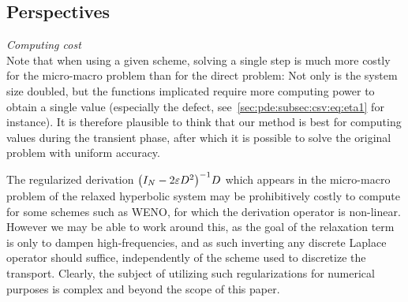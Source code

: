 \subsection{Perspectives} 
\label{sec:tests:subsec:thoughts}

\hspace*{1em}

\noindent\textit{Computing cost}\\
%
Note that when using a given scheme, solving a single step is much more
costly for the micro-macro problem than for the direct problem: Not only
is the system size doubled, but the functions implicated require more
computing power to obtain a single value (especially the defect,
see~\eqref{sec:pde:subsec:csv:eq:eta1} for instance). It is therefore 
plausible to think that our method is best for computing values during the
transient phase, after which it is possible to solve the original problem 
with uniform accuracy. 

The regularized derivation $\big( I_N - 2\varepsilon D^2 \big)^{-1} D$ which
appears in the micro-macro problem of the relaxed hyperbolic system may be
prohibitively costly to compute for some schemes such as WENO, for which
the derivation operator is non-linear. However we may be able to work
around this, as the goal of the relaxation term is only to dampen
high-frequencies, and as such inverting any discrete Laplace operator
should suffice, independently of the scheme used to discretize the
transport. Clearly, the subject of utilizing such regularizations for
numerical purposes is complex and beyond the scope of this paper.


